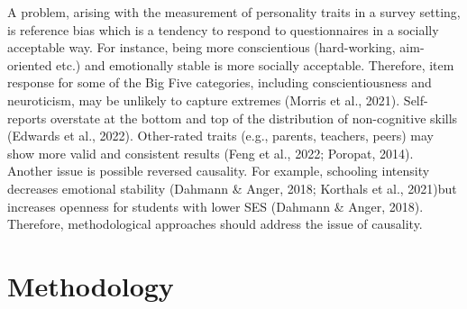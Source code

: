 \documentclass[
  12pt,
  a4paper,
]{article}
\begin{document}
A problem, arising with the measurement of personality traits in a
survey setting, is reference bias which is a tendency to respond to
questionnaires in a socially acceptable way. For instance, being more
conscientious (hard-working, aim-oriented etc.) and emotionally stable
is more socially acceptable. Therefore, item response for some of the
Big Five categories, including conscientiousness and neuroticism, may be
unlikely to capture extremes (Morris et al., 2021). Self-reports
overstate at the bottom and top of the distribution of non-cognitive
skills (Edwards et al., 2022). Other-rated traits (e.g., parents,
teachers, peers) may show more valid and consistent results (Feng et
al., 2022; Poropat, 2014). Another issue is possible reversed causality.
For example, schooling intensity decreases emotional stability (Dahmann
\& Anger, 2018; Korthals et al., 2021)but increases openness for
students with lower SES (Dahmann \& Anger, 2018). Therefore,
methodological approaches should address the issue of causality.

\hypertarget{methodology}{%
\section{Methodology}\label{methodology}}
\end{document}
